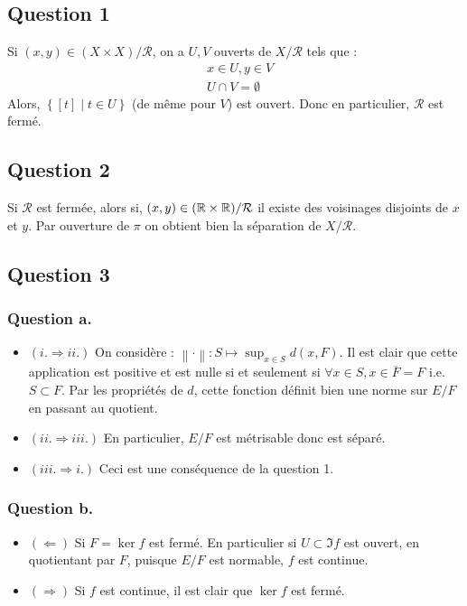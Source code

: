 \documentclass{cours}
\begin{document}
    \subsection{Question 1}
        Si $(x, y) \in (X \times X)/\mathcal{R}$, on a $U, V$ ouverts de $X/\mathcal{R}$ tels que : 
        \[
            \begin{aligned}
                &x \in U, y \in V\\
                &U\cap V = \emptyset
            \end{aligned}    
        \]
        Alors, $\left\{\left[t\right] \mid t \in U\right\}$ (de même pour $V$) est ouvert. Donc en particulier, $\mathcal{R}$ est fermé.

    \subsection{Question 2}
        Si $\mathcal{R}$ est fermée, alors si, $(x, y) \in (\mathbb{R} \times \mathbb{R})/\mathcal{R}$ il existe des voisinages disjoints de $x$ et $y$. Par ouverture de $\pi$ on obtient bien la séparation de $X/\mathcal{R}$.

    \subsection{Question 3}
        \subsubsection{Question a.}
            \begin{itemize}
                \item $(i. \Rightarrow ii.)$  On considère : $\left\lVert\cdot\right\rVert : S \mapsto \sup_{x\in S} d(x, F)$. Il est clair que cette application est positive et est nulle si et seulement si $\forall x \in S, x \in \overline{F} = F$ i.e. $S \subset F$. Par les propriétés de $d$, cette fonction définit bien une norme sur $E/F$ en passant au quotient. 
                \item $(ii. \Rightarrow iii.)$ En particulier, $E/F$ est métrisable donc est séparé. 
                \item $(iii. \Rightarrow i.)$ Ceci est une conséquence de la question 1. 
            \end{itemize}

        \subsubsection{Question b.}
            \begin{itemize}
                \item $(\Leftarrow)$ Si $F = \ker f$ est fermé. En particulier si $U \subset \Im f$ est ouvert, en quotientant par $F$, puisque $E/F$ est normable, $f$ est continue. 
                \item $(\Rightarrow)$ Si $f$ est continue, il est clair que $\ker f$ est fermé. 
            \end{itemize}
\end{document}
